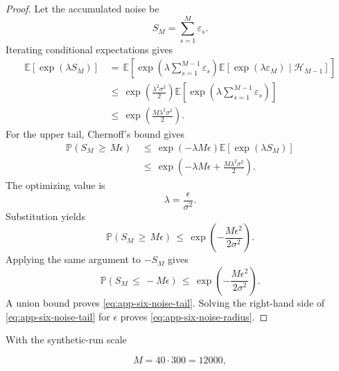 \documentclass{article} %
\begin{document}
\begin{proof}
Let the accumulated noise be
\begin{equation}
\label{eq:app-six-proof-noise-sum}
S_M
=
\sum_{s=1}^{M}\varepsilon_s.
\end{equation}
Iterating conditional expectations gives
\begin{align}
\label{eq:app-six-proof-noise-mgf}
\mathbb{E}\!\left[\exp(\lambda S_M)\right]
&\,=\,
\mathbb{E}\!\left[
\exp\!\left(\lambda\sum_{s=1}^{M-1}\varepsilon_s\right)
\mathbb{E}\!\left[
\exp(\lambda\varepsilon_M)\mid \mathcal{H}_{M-1}
\right]
\right]
\\
&\,\le\,
\exp\!\left(\frac{\lambda^2\sigma^2}{2}\right)
\mathbb{E}\!\left[
\exp\!\left(\lambda\sum_{s=1}^{M-1}\varepsilon_s\right)
\right]
\\
&\,\le\,
\exp\!\left(\frac{M\lambda^2\sigma^2}{2}\right).
\end{align}
For the upper tail, Chernoff's bound gives
\begin{align}
\label{eq:app-six-proof-noise-chernoff}
\mathbb{P}(S_M\,\ge\, M\epsilon)
&\,\le\,
\exp(-\lambda M\epsilon)
\mathbb{E}[\exp(\lambda S_M)]
\\
&\,\le\,
\exp\!\left(
-\lambda M\epsilon+\frac{M\lambda^2\sigma^2}{2}
\right).
\end{align}
The optimizing value is
\begin{equation}
\label{eq:app-six-proof-noise-lambda}
\lambda=\frac{\epsilon}{\sigma^2}.
\end{equation}
Substitution yields
\begin{equation}
\label{eq:app-six-proof-noise-upper}
\mathbb{P}(S_M\,\ge\, M\epsilon)
\,\le\,
\exp\!\left(-\frac{M\epsilon^2}{2\sigma^2}\right).
\end{equation}
Applying the same argument to \(-S_M\) gives
\begin{equation}
\label{eq:app-six-proof-noise-lower}
\mathbb{P}(S_M\,\le\, -M\epsilon)
\,\le\,
\exp\!\left(-\frac{M\epsilon^2}{2\sigma^2}\right).
\end{equation}
A union bound proves \eqref{eq:app-six-noise-tail}.  Solving the right-hand side of \eqref{eq:app-six-noise-tail} for \(\epsilon\) proves \eqref{eq:app-six-noise-radius}.
\end{proof}

With the synthetic-run scale

\begin{equation}
\label{eq:app-six-noise-example-M}
M=40\cdot 300=12000,
\end{equation}
\end{document}
